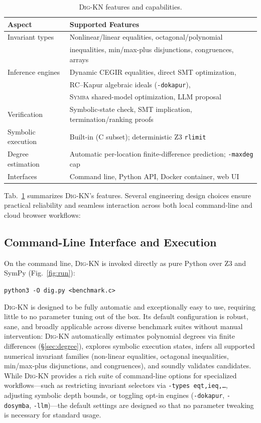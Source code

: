 \documentclass[runningheads]{llncs}
\newcommand{\tool}{\textsc{Dig-KN}\xspace}
\newcommand{\code}[1]{\texttt{\small #1}}
\begin{document}
\begin{table}[t]
\centering
\caption{\tool{} features and capabilities.}
\label{tab:features}
\small
\begin{tabular}{ll}
\toprule
\textbf{Aspect} & \textbf{Supported Features} \\
\midrule
Invariant types & Nonlinear/linear equalities, octagonal/polynomial \\
 & inequalities, min/max-plus disjunctions, congruences, arrays \\
Inference engines & Dynamic CEGIR equalities, direct SMT optimization, \\
 & RC--Kapur algebraic ideals (\code{-dokapur}), \\
 & \textsc{Symba} shared-model optimization, LLM proposal \\
Verification & Symbolic-state check, SMT implication, termination/ranking proofs \\
Symbolic execution & Built-in (C subset); deterministic Z3 \code{rlimit} \\
Degree estimation & Automatic per-location finite-difference prediction; \code{-maxdeg} cap \\
Interfaces & Command line, Python API, Docker container, web UI \\
\bottomrule
\end{tabular}
\end{table}

Tab.~\ref{tab:features} summarizes \tool{}'s features.  Several engineering design choices ensure practical reliability and seamless interaction across both local command-line and cloud browser workflows:

\subsection{Command-Line Interface and Execution}
\label{sec:cli}
On the command line, \tool{} is invoked directly as pure Python over Z3 and SymPy (Fig.~\ref{fig:run}):
\begin{center}
\code{python3 -O dig.py <benchmark.c>}
\end{center}
\tool{} is designed to be fully automatic and exceptionally easy to use, requiring little to no parameter tuning out of the box.  Its default configuration is robust, sane, and broadly applicable across diverse benchmark suites without manual intervention: \tool{} automatically estimates polynomial degrees via finite differences (\S\ref{sec:degree}), explores symbolic execution states, infers all supported numerical invariant families (non-linear equalities, octagonal inequalities, min/max-plus disjunctions, and congruences), and soundly validates candidates.  While \tool{} provides a rich suite of command-line options for specialized workflows---such as restricting invariant selectors via \code{-types eqt,ieq,\dots}, adjusting symbolic depth bounds, or toggling opt-in engines (\code{-dokapur}, \code{-dosymba}, \code{-llm})---the default settings are designed so that no parameter tweaking is necessary for standard usage.
\end{document}

